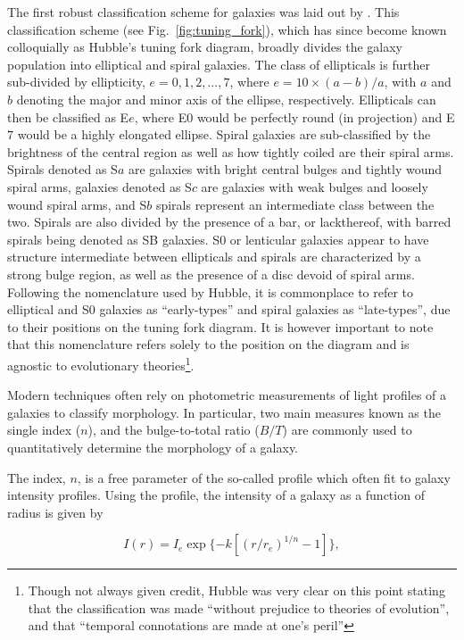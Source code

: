 The first robust classification scheme for galaxies was laid out by
\citet{hubble1926}.  This classification scheme (see
Fig.~\ref{fig:tuning_fork}), which has since become known colloquially
as Hubble's tuning fork diagram, broadly divides the galaxy
population into elliptical and spiral galaxies.  The class of
ellipticals is further sub-divided by ellipticity, $e = 0,1,2,...,7$,
where $e = 10 \times (a-b)/a$, with $a$ and $b$ denoting the major and
minor axis of the ellipse, respectively.  Ellipticals can then be
classified as E$e$, where E$0$ would be perfectly round (in
projection) and E$7$ would be a highly elongated ellipse.  Spiral
galaxies are sub-classified by the brightness of the central region as
well as how tightly coiled are their spiral arms.  Spirals denoted as
S$a$ are galaxies with bright central bulges and tightly wound spiral
arms, galaxies denoted as S$c$ are galaxies with weak bulges and
loosely wound spiral arms, and S$b$ spirals represent an intermediate
class between the two.  Spirals are also divided by the presence of a
bar, or lackthereof, with barred spirals being denoted as SB galaxies.
S$0$ or lenticular galaxies appear to have structure intermediate
between ellipticals and spirals are characterized by a strong bulge
region, as well as the presence of a disc devoid of spiral arms.
Following the nomenclature used by Hubble, it is commonplace to refer
to elliptical and S0 galaxies as ``early-types'' and spiral galaxies
as ``late-types'', due to their positions on the tuning fork diagram.
It is however important to note that this nomenclature refers solely
to the position on the diagram and is agnostic to evolutionary
theories\footnote{Though not always given credit, Hubble was
  very clear on this point stating that the classification was made
  ``without prejudice to theories of evolution'', and that ``temporal
  connotations are made at one's peril''}.
\par
Modern techniques often rely on photometric measurements of 
light profiles of a galaxies to classify morphology.  In particular, two
main measures known as the single \ser index ($n$), and the
bulge-to-total ratio ($B/T$) are commonly used to quantitatively determine
the morphology of a galaxy.
\par
The \ser index, $n$, is a free parameter of the so-called
\ser profile \citep{sersic1968} which often fit to galaxy
intensity profiles.  Using the \ser profile, the intensity of a
galaxy as a function of radius is given by 

\begin{equation}
  I(r) = I_e \exp \{-k [(r/r_e)^{1/n} - 1]\},
\end{equation}

